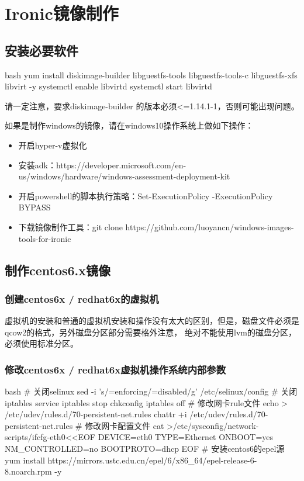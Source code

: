 \chapter{Ironic镜像制作}
\section{安装必要软件}
\begin{code-block}{bash}
yum install diskimage-builder libguestfs-tools libguestfs-tools-c libguestfs-xfs libvirt -y
systemctl enable libvirtd
systemctl start libvirtd
\end{code-block}

{\color{red}请一定注意，要求diskimage-builder 的版本必须<=1.14.1-1，否则可能出现问题。}

如果是制作windows的镜像，请在windows10操作系统上做如下操作：
\begin{itemize}
  \item 开启hyper-v虚拟化
  \item 安装adk：https://developer.microsoft.com/en-us/windows/hardware/windows-assessment-deployment-kit
  \item 开启powershell的脚本执行策略：Set-ExecutionPolicy -ExecutionPolicy BYPASS
  \item 下载镜像制作工具：git clone https://github.com/luoyancn/windows-images-tools-for-ironic
\end{itemize}

\section{制作centos6.x镜像}
\subsection{创建centos6x / redhat6x的虚拟机}
虚拟机的安装和普通的虚拟机安装和操作没有太大的区别，但是，磁盘文件必须是qcow2的格式，另外磁盘分区部分需要格外注意，
{\color{red}绝对不能使用lvm的磁盘分区，必须使用标准分区。}

\subsection{修改centos6x / redhat6x虚拟机操作系统内部参数}
\begin{code-block}{bash}
# 关闭selinux
sed -i 's/=enforcing/=disabled/g' /etc/selinux/config
# 关闭iptables
service iptables stop
chkconfig iptables off
# 修改网卡rule文件
echo > /etc/udev/rules.d/70-persistent-net.rules
chattr +i /etc/udev/rules.d/70-persistent-net.rules
# 修改网卡配置文件
cat >/etc/sysconfig/network-scripts/ifcfg-eth0<<EOF
DEVICE=eth0
TYPE=Ethernet
ONBOOT=yes
NM_CONTROLLED=no
BOOTPROTO=dhcp
EOF
# 安装centos6的epel源
yum install https://mirrors.ustc.edu.cn/epel/6/x86_64/epel-release-6-8.noarch.rpm -y
\end{code-block}

